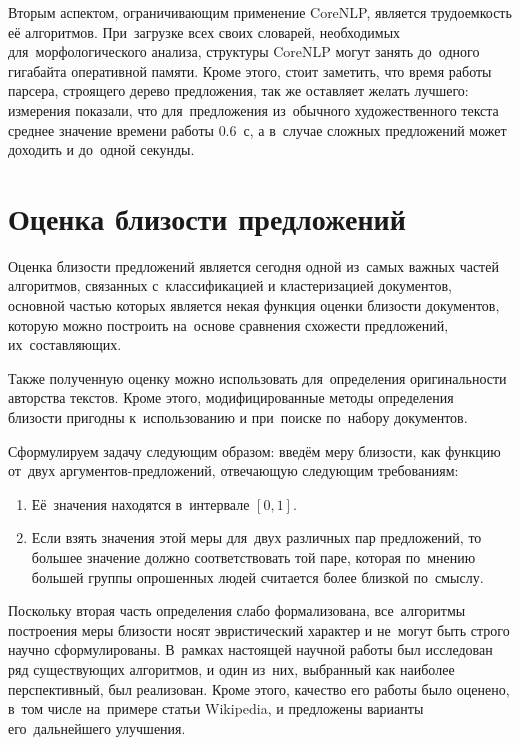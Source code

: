 Вторым аспектом, ограничивающим применение CoreNLP, является трудоемкость её алгоритмов. 
При~загрузке всех своих словарей, необходимых для~морфологического анализа, 
структуры CoreNLP могут занять до~одного гигабайта оперативной памяти.
Кроме этого, стоит заметить, что время работы парсера, строящего дерево предложения,
так же оставляет желать лучшего: измерения показали, что для~предложения
из~обычного художественного текста среднее значение времени работы $0.6$~с,
а в~случае сложных предложений может доходить и до~одной секунды.

\section{Оценка близости предложений}

Оценка близости предложений является сегодня одной из~самых важных частей алгоритмов,
 связанных с~классификацией и кластеризацией документов\cite{textminingsurvey}, 
основной частью которых является некая функция оценки близости документов,
которую можно построить на~основе сравнения схожести предложений, их~составляющих.

Также полученную оценку можно использовать для~определения оригинальности
авторства текстов.
Кроме этого, модифицированные методы определения близости пригодны к~использованию и при~поиске по~набору документов.

Сформулируем задачу следующим образом:
введём меру близости, как функцию от~двух аргументов-предложений, отвечающую следующим требованиям:

\begin{enumerate}

\item {
Её~значения находятся в~интервале $[0,1]$.
}

\item {
Если взять значения этой меры для~двух различных пар предложений, 
то большее значение должно соответствовать той паре, которая по~мнению большей группы опрошенных людей считается более близкой по~смыслу.
}

\end{enumerate}

Поскольку вторая часть определения слабо формализована, 
все~алгоритмы построения меры близости носят эвристический характер и не~могут быть строго научно сформулированы.
В~рамках настоящей научной работы был исследован ряд существующих алгоритмов,
и один из~них, выбранный как наиболее перспективный, был реализован.
Кроме этого, качество его работы было оценено, в~том числе на~примере статьи Wikipedia, 
и предложены варианты его~дальнейшего улучшения.

